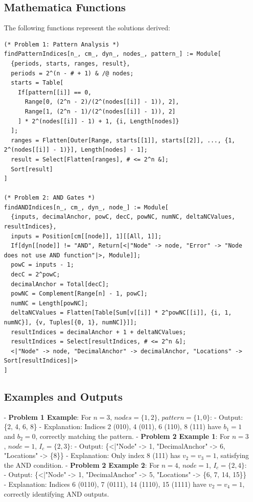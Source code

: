\documentclass[12pt]{article}
\begin{document}
\subsection{Mathematica Functions}
The following functions represent the solutions derived:
\begin{lstlisting}[caption={Reference Mathematica Functions}]
(* Problem 1: Pattern Analysis *)
findPatternIndices[n_, cm_, dyn_, nodes_, pattern_] := Module[
  {periods, starts, ranges, result},
  periods = 2^(n - # + 1) & /@ nodes;
  starts = Table[
    If[pattern[[i]] == 0, 
      Range[0, (2^n - 2)/(2^(nodes[[i]] - 1)), 2], 
      Range[1, (2^n - 1)/(2^(nodes[[i]] - 1)), 2]
    ] * 2^(nodes[[i]] - 1) + 1, {i, Length[nodes]}
  ];
  ranges = Flatten[Outer[Range, starts[[1]], starts[[2]], ..., {1, 2^(nodes[[i]] - 1)}], Length[nodes] - 1];
  result = Select[Flatten[ranges], # <= 2^n &];
  Sort[result]
]

(* Problem 2: AND Gates *)
findANDIndices[n_, cm_, dyn_, node_] := Module[
  {inputs, decimalAnchor, powC, decC, powNC, numNC, deltaNCValues, resultIndices},
  inputs = Position[cm[[node]], 1][[All, 1]];
  If[dyn[[node]] != "AND", Return[<|"Node" -> node, "Error" -> "Node does not use AND function"|>, Module]];
  powC = inputs - 1;
  decC = 2^powC;
  decimalAnchor = Total[decC];
  powNC = Complement[Range[n] - 1, powC];
  numNC = Length[powNC];
  deltaNCValues = Flatten[Table[Sum[v[[i]] * 2^powNC[[i]], {i, 1, numNC}], {v, Tuples[{0, 1}, numNC]}]];
  resultIndices = decimalAnchor + 1 + deltaNCValues;
  resultIndices = Select[resultIndices, # <= 2^n &];
  <|"Node" -> node, "DecimalAnchor" -> decimalAnchor, "Locations" -> Sort[resultIndices]|>
]
\end{lstlisting}

\subsection{Examples and Outputs}
- \textbf{Problem 1 Example}: For \( n = 3 \), \( nodes = \{1, 2\} \), \( pattern = \{1, 0\} \):
  - Output: \{2, 4, 6, 8\}
  - Explanation: Indices 2 (010), 4 (011), 6 (110), 8 (111) have \( b_1 = 1 \) and \( b_2 = 0 \), correctly matching the pattern.
- \textbf{Problem 2 Example 1}: For \( n = 3 \), \( node = 1 \), \( I_c = \{2, 3\} \):
  - Output: \{<|"Node" -> 1, "DecimalAnchor" -> 6, "Locations" -> \{8\}\>\}
  - Explanation: Only index 8 (111) has \( v_2 = v_3 = 1 \), satisfying the AND condition.
- \textbf{Problem 2 Example 2}: For \( n = 4 \), \( node = 1 \), \( I_c = \{2, 4\} \):
  - Output: \{<|"Node" -> 1, "DecimalAnchor" -> 5, "Locations" -> \{6, 7, 14, 15\}\>\}
  - Explanation: Indices 6 (0110), 7 (0111), 14 (1110), 15 (1111) have \( v_2 = v_4 = 1 \), correctly identifying AND outputs.
\end{document}
